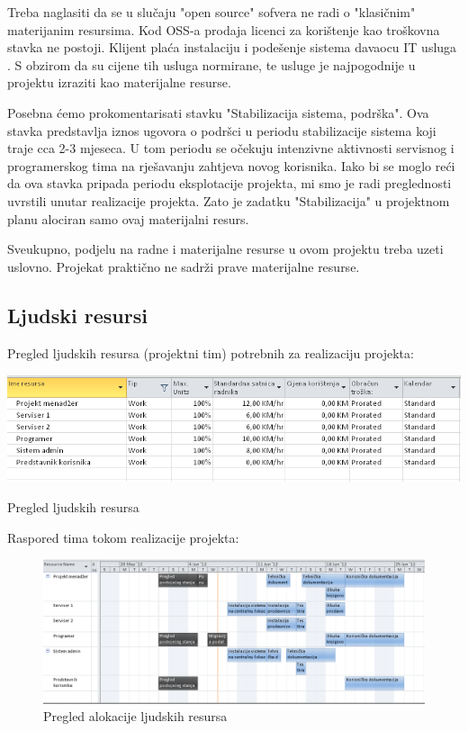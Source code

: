 \documentclass[times, utf8, seminar]{fit}
\begin{document}
Treba naglasiti da se u slučaju "open source" sofvera ne radi o "klasičnim" materijanim resursima. Kod OSS-a prodaja licenci za korištenje kao troškovna stavka ne postoji. Klijent plaća instalaciju i podešenje sistema davaocu IT usluga . S obzirom da su cijene tih usluga normirane, te usluge je najpogodnije u projektu izraziti kao materijalne resurse. 

Posebna ćemo prokomentarisati stavku "Stabilizacija sistema, podrška". Ova stavka predstavlja iznos ugovora o podršci u periodu stabilizacije sistema koji traje cca 2-3 mjeseca. U tom periodu se očekuju intenzivne aktivnosti servisnog i programerskog tima na rješavanju zahtjeva novog korisnika. Iako bi se moglo reći da ova stavka pripada periodu eksplotacije projekta, mi smo je radi preglednosti uvrstili unutar realizacije projekta. Zato je zadatku "Stabilizacija" u projektnom planu alociran samo ovaj materijalni resurs. 

Sveukupno, podjelu na radne i materijalne resurse u ovom projektu treba uzeti uslovno. Projekat praktično ne sadrži prave materijalne resurse.

\subsection{Ljudski resursi}
Pregled ljudskih resursa (projektni tim) potrebnih za realizaciju projekta:

\begin{table}[!h]
\centering
\includegraphics[width=15.5cm]{img/ljudski_resursi.png}
\caption{Pregled ljudskih resursa}
\end{table}

Raspored tima tokom realizacije projekta:

\begin{figure}[!h]
\centering
\includegraphics[width=15.5cm]{img/team_planner.png}
\caption{Pregled alokacije ljudskih resursa}
\end{figure}
\end{document}
